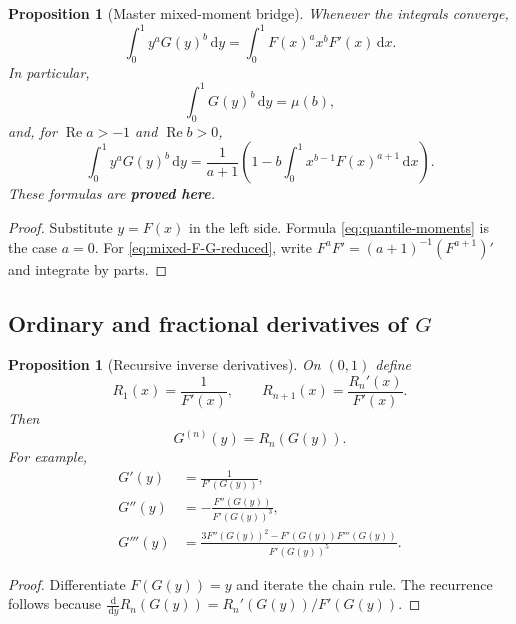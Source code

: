 \documentclass[11pt]{article}
\newcommand{\statusproved}{\textcolor{statusgreen}{\textbf{proved here}}}
\newtheorem{proposition}[theorem]{Proposition}
\theoremstyle{definition}
\theoremstyle{remark}
\newcommand{\dd}{\,\mathrm d}
\newcommand{\Ree}{\operatorname{Re}}
\begin{document}
\begin{proposition}[Master mixed-moment bridge]
\label{prop:mixed-F-G}
Whenever the integrals converge,
\begin{equation}
 \int_0^1y^aG(y)^b\dd y
 =\int_0^1F(x)^a x^bF'(x)\dd x.
 \label{eq:mixed-F-G}
\end{equation}
In particular,
\begin{equation}
 \int_0^1G(y)^b\dd y=\mu(b),
 \label{eq:quantile-moments}
\end{equation}
and, for $\Ree a>-1$ and $\Ree b>0$,
\begin{equation}
 \int_0^1y^aG(y)^b\dd y
 =\frac1{a+1}\left(1-b\int_0^1x^{b-1}F(x)^{a+1}\dd x\right).
 \label{eq:mixed-F-G-reduced}
\end{equation}
These formulas are \statusproved.
\end{proposition}

\begin{proof}
Substitute $y=F(x)$ in the left side.  Formula \cref{eq:quantile-moments} is the case
$a=0$.  For \cref{eq:mixed-F-G-reduced}, write
$F^aF'=(a+1)^{-1}(F^{a+1})'$ and integrate by parts.
\end{proof}

\subsection{Ordinary and fractional derivatives of $G$}

\begin{proposition}[Recursive inverse derivatives]
\label{prop:inverse-derivatives}
On $(0,1)$ define
\begin{equation}
 R_1(x)=\frac1{F'(x)},
 \qquad
 R_{n+1}(x)=\frac{R_n'(x)}{F'(x)}.
 \label{eq:Rn-recurrence}
\end{equation}
Then
\begin{equation}
 G^{(n)}(y)=R_n(G(y)).
 \label{eq:inverse-n-derivative}
\end{equation}
For example,
\begin{align}
 G'(y)&=\frac1{F'(G(y))},\label{eq:Gprime}\\
 G''(y)&=-\frac{F''(G(y))}{F'(G(y))^3},\label{eq:Gsecond}\\
 G'''(y)&=
 \frac{3F''(G(y))^2-F'(G(y))F'''(G(y))}{F'(G(y))^5}.
 \label{eq:Gthird}
\end{align}
\end{proposition}

\begin{proof}
Differentiate $F(G(y))=y$ and iterate the chain rule.  The recurrence follows because
$\frac{\dd}{\dd y}R_n(G(y))=R_n'(G(y))/F'(G(y))$.
\end{proof}
\end{document}
